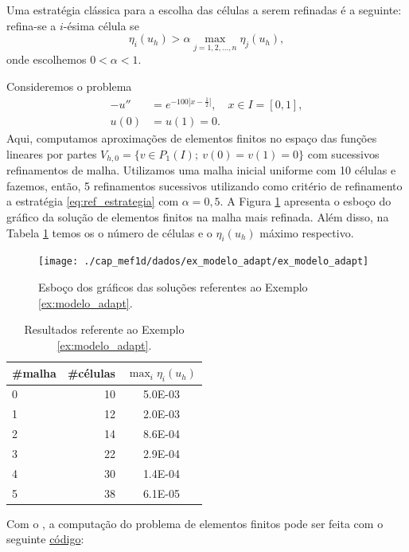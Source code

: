 Uma estratégia clássica para a escolha das células a serem refinadas é a seguinte: refina-se a $i$-ésima célula se
\begin{equation}\label{eq:ref_estrategia}
  \eta_i(u_h) > \alpha \max_{j=1, 2, \dotsc, n} \eta_j(u_h),
\end{equation}
onde escolhemos $0 < \alpha < 1$.

\begin{ex}\label{ex:modelo_adapt}
  Consideremos o problema
  \begin{align}
    -u'' &= e^{-100|x-\frac{1}{2}|},\quad x\in I=[0,1],\\
    u(0) &= u(1) = 0.
  \end{align}
  Aqui, computamos aproximações de elementos finitos no espaço das funções lineares por partes $V_{h,0} = \{v\in P_1(I);~v(0)=v(1)=0\}$ com sucessivos refinamentos de malha. Utilizamos uma malha inicial uniforme com 10 células e fazemos, então, 5 refinamentos sucessivos utilizando como critério de refinamento a estratégia \eqref{eq:ref_estrategia} com $\alpha = 0,5$. A Figura \ref{fig:ex_modelo_adapt} apresenta o esboço do gráfico da solução de elementos finitos na malha mais refinada. Além disso, na Tabela \ref{tab:ex_modelo_adapt} temos os o número de células e o $\eta_i(u_h)$ máximo respectivo.

\begin{figure}[h!]
  \centering
  \texttt{[image: ./cap\_mef1d/dados/ex\_modelo\_adapt/ex\_modelo\_adapt]}
  \caption{Esboço dos gráficos das soluções referentes ao Exemplo \ref{ex:modelo_adapt}.}
  \label{fig:ex_modelo_adapt}
\end{figure}

\begin{table}[h!]
  \centering
  \begin{tabular}{lrc}
    \#malha & \#células & $\max_i\eta_i(u_h)$\\\hline
    0 & 10 & 5.0E-03\\
    1 & 12 & 2.0E-03\\
    2 & 14 & 8.6E-04\\
    3 & 22 & 2.9E-04\\
    4 & 30 & 1.4E-04\\
    5 & 38 & 6.1E-05\\\hline
  \end{tabular}
  \caption{Resultados referente ao Exemplo \ref{ex:modelo_adapt}.}
  \label{tab:ex_modelo_adapt}
\end{table}

\ifispython
Com o \fenics, a computação do problema de elementos finitos pode ser feita com o seguinte \href{https://github.com/phkonzen/notas/blob/master/src/MetodoElementosFinitos/cap_mef1d/dados/ex_modelo_adapt/ex_modelo_adapt.py}{código}:

\fi
\end{ex}

